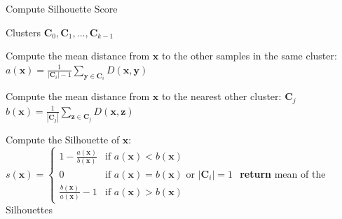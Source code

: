 \documentclass[./main.tex]{subfiles}
\begin{document}
\begin{algorithm}[htbp]
    \caption{Compute Silhouette Score \cite{MAD_L12}}
    \label{Algorithm:Silhouette_score}
    \begin{algorithmic}[1]
        \Require Clusters $\bm{C}_0, \bm{C}_1, ..., \bm{C}_{k - 1}$
                \State \begin{varwidth}[t]{\linewidth}
                    Compute the mean distance from $\bm{x}$ to the other samples in the same cluster: $a(\bm{x}) = \frac{1}{|\bm{C}_i| - 1} \sum_{\bm{y} \in \bm{C}_i} D(\bm{x}, \bm{y})$
                \end{varwidth}
                \State \begin{varwidth}[t]{\linewidth}
                Compute the mean distance from $\bm{x}$ to the nearest other cluster: $\bm{C}_j$ $b(\bm{x}) = \frac{1}{| \bm{C}_j |} \sum_{\bm{z} \in \bm{C}_j} D(\bm{x}, \bm{z})$
                \end{varwidth}
                \State Compute the Silhouette of $\bm{x}$:
                \begin{math}
                    s(\bm{x}) =
                    \begin{cases}
                        1 - \frac{a(\bm{x})}{b(\bm{x})} & \text{if } a(\bm{x}) < b(\bm{x}) \\
                        0 & \text{if } a(\bm{x}) = b(\bm{x}) \text{ or } |\bm{C}_i| = 1 \\
                        \frac{b(\bm{x})}{a(\bm{x})} - 1 & \text{if } a(\bm{x}) > b(\bm{x})
                    \end{cases}
                \end{math}
            \EndFor
        \EndFor
        \State \textbf{return} mean of the Silhouettes
    \end{algorithmic}
\end{algorithm}
\end{document}
